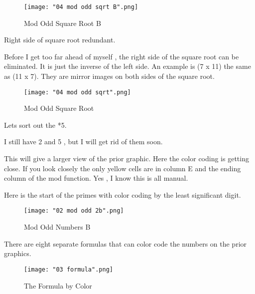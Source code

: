 \documentclass[12pt,letterpaper,oneside,titlepage]{article}
\begin{document}
\begin{figure}[h]
	\centering
	\texttt{[image: "04 mod odd sqrt B".png]}
	\caption{Mod Odd Square Root B}
\end{figure}
\pagebreak  

\par 
Right side of square root redundant.
\\
\par 
Before I get too far ahead of myself , the right side of the square root can be eliminated.
It is just the inverse of the left side. An example is (7 x 11) the same as (11 x 7). They are mirror images on both sides of the square root.
\begin{figure}[h]
	\centering
	\texttt{[image: "04 mod odd sqrt".png]}
	\caption{Mod Odd Square Root}
\end{figure}
\pagebreak


\par 
Lets sort out the *5.
\\
\par 
I still have 2 and 5 , but I will get rid of them soon.
\\
\par 
This will give a larger view of the prior graphic. Here the color coding is getting close.
If you look closely the only yellow cells are in column E and the ending column of the mod function. Yes , I know this is all manual. 
\\
\par 
Here is the start of the primes with color coding by the least significant digit.
\begin{figure}[h]
	\centering
	\texttt{[image: "02 mod odd 2b".png]}
	\caption{Mod Odd Numbers B}
\end{figure}
\pagebreak  



\par There are eight separate formulas that can color code the numbers on the prior graphics.
\begin{figure}[h]
	\centering
	\texttt{[image: "03 formula".png]}
	\caption{The Formula by Color}
\end{figure}
\pagebreak  
\end{document}
